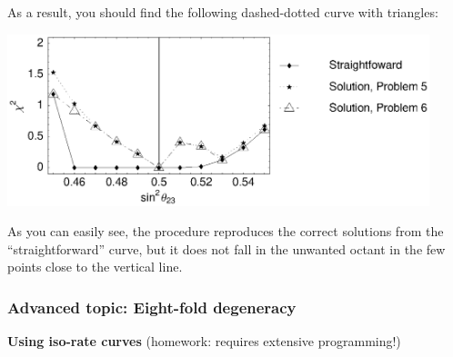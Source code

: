 \documentclass[12pt,a4paper]{article}
\newcommand{\aufg}[1]{\vspace{4mm}{\bf\underline{Problem #1:}}\vspace{3mm}}
\begin{document}
As a result, you should find the following dashed-dotted curve with triangles:
\begin{center}
\includegraphics[height=5cm]{problem6}
\end{center}
As you can easily see, the procedure reproduces the correct solutions from the ``straightforward'' curve, but it does not fall in the unwanted octant in the few points close to the vertical line. 

\subsubsection*{Advanced topic: Eight-fold degeneracy}


\aufg{7} {\bf Using iso-rate curves} (homework: requires extensive programming!)
\end{document}

